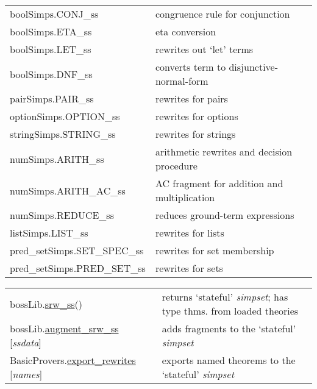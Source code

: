 \documentclass[landscape,10pt]{article}
\newcommand{\hol}[2]{{\sffamily #1.\href{#1.#2.html}{#2}}}
\newcommand{\holnoref}[2]{{\sffamily #1.#2}}
\newcommand{\var}[1]{{\emph{#1}}}
\begin{document}
\begin{multicols}{2}
\noindent\begin{tabular}{ll}
\holnoref{boolSimps}{CONJ_ss} & congruence rule for conjunction \\
\holnoref{boolSimps}{ETA_ss} & eta conversion \\
\holnoref{boolSimps}{LET_ss} & rewrites out `let' terms \\
\holnoref{boolSimps}{DNF_ss} & converts term to disjunctive-normal-form\\
\holnoref{pairSimps}{PAIR_ss} & rewrites for pairs \\
\holnoref{optionSimps}{OPTION_ss} & rewrites for options \\
\holnoref{stringSimps}{STRING_ss} & rewrites for strings \\
\holnoref{numSimps}{ARITH_ss} & arithmetic rewrites and decision procedure \\
\holnoref{numSimps}{ARITH_AC_ss} & AC fragment for addition and multiplication \\
\holnoref{numSimps}{REDUCE_ss} & reduces ground-term expressions \\
\holnoref{listSimps}{LIST_ss} & rewrites for lists \\
\holnoref{pred_setSimps}{SET_SPEC_ss} & rewrites for set membership \\
\holnoref{pred_setSimps}{PRED_SET_ss} & rewrites for sets \\
\end{tabular}

\noindent\begin{tabular}{ll}
\hol{bossLib}{srw_ss}() & returns `stateful' \emph{simpset}; has type thms. from loaded theories \\
\hol{bossLib}{augment_srw_ss} [\var{ssdata}] & adds fragments to the `stateful' \emph{simpset} \\
\hol{BasicProvers}{export_rewrites} [\var{names}] & exports named theorems to the `stateful' \emph{simpset} \\
\end{tabular}
\end{multicols}
\end{document}
